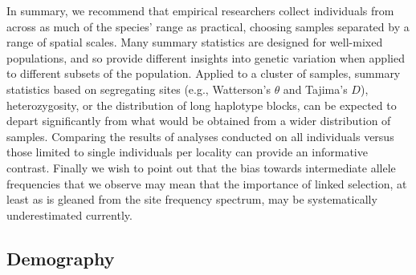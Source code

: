 \documentclass[10pt,twoside,lineno,hidelinks]{preprint}
\begin{document}
In summary, 
we recommend that empirical researchers collect individuals from across as much of the species' range as practical,
choosing samples separated by a range of spatial scales.
Many summary statistics are designed for well-mixed populations,
and so provide different insights into genetic variation
when applied to different subsets of the population.
Applied to a cluster of samples, summary statistics based on segregating sites 
(e.g., Watterson's $\theta$ and Tajima's $D$), 
heterozygosity, or the distribution of long haplotype blocks, 
can be expected to depart significantly from what would be obtained from a wider distribution of samples.
Comparing the results of analyses conducted on all individuals versus those limited to single individuals per locality 
can provide an informative contrast. Finally we wish to point out that the bias towards intermediate allele frequencies that we observe may mean that the importance of linked selection, at least as is gleaned from the site frequency spectrum, may be systematically underestimated currently.

\subsection{Demography}
\end{document}
